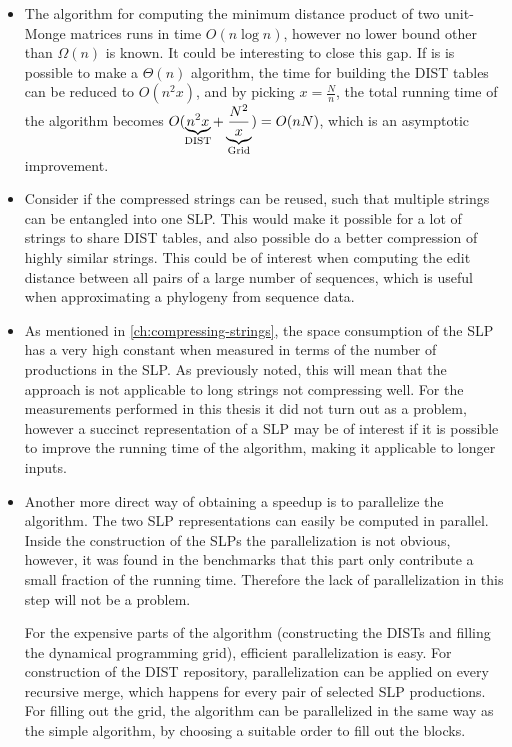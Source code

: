 \documentclass[twoside,11pt,openright]{report}
\newcommand{\DIST}{\operatorname{DIST}}
\begin{document}
\begin{itemize}
  \item The algorithm for computing the minimum distance product of two unit-Monge matrices runs in time $O(n \log{n})$, however no lower bound other than $\Omega(n)$ is known. It could be interesting to close this gap. If is is possible to make a $\Theta(n)$ algorithm, the time for building the DIST tables can be reduced to $O(n^2 x)$, and by picking $x = \frac{N}{n}$, the total running time of the algorithm becomes $O(\underbrace{n^2 x}_{\mathclap{\DIST}} + \underbrace{\frac{N^2}{x}}_{\mathclap{\text{Grid}}}) = O(nN)$, which is an asymptotic improvement.

  \item Consider if the compressed strings can be reused, such that multiple strings can be entangled into one SLP. This would make it possible for a lot of strings to share DIST tables, and also possible do a better compression of highly similar strings. This could be of interest when computing the edit distance between all pairs of a large number of sequences, which is useful when approximating a phylogeny from sequence data.

  \item As mentioned in \cref{ch:compressing-strings}, the space consumption of the SLP has a very high constant when measured in terms of the number of productions in the SLP. As previously noted, this will mean that the approach is not applicable to long strings not compressing well. For the measurements performed in this thesis it did not turn out as a problem, however a succinct representation of a SLP may be of interest if it is possible to improve the running time of the algorithm, making it applicable to longer inputs.

  \item Another more direct way of obtaining a speedup is to parallelize the algorithm. The two SLP representations can easily be computed in parallel. Inside the construction of the SLPs the parallelization is not obvious, however, it was found in the benchmarks that this part only contribute a small fraction of the running time. Therefore the lack of parallelization in this step will not be a problem.

  For the expensive parts of the algorithm (constructing the DISTs and filling the dynamical programming grid), efficient parallelization is easy. For construction of the DIST repository, parallelization can be applied on every recursive merge, which happens for every pair of selected SLP productions.
  For filling out the grid, the algorithm can be parallelized in the same way as the simple algorithm, by choosing a suitable order to fill out the blocks.
\end{itemize}


 

\end{document}
